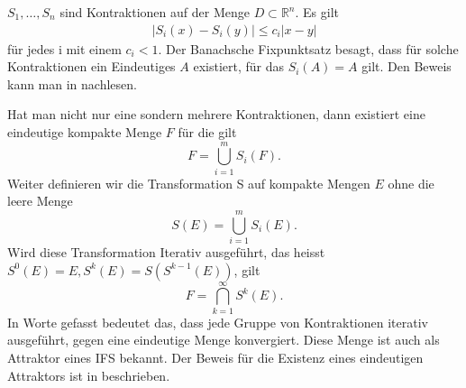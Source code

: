 $S_1,\dots,S_n$ sind Kontraktionen auf der Menge $D \subset \mathbb{R}^n$. Es gilt
\begin{align}
	|S_i(x) - S_i(y)| \leq c_i|x - y|
\end{align}
für jedes i mit einem $c_i < 1$.
Der Banachsche Fixpunktsatz besagt, dass für solche Kontraktionen ein Eindeutiges $A$ existiert, für das $S_i(A) = A$ gilt.
Den Beweis kann man in \cite{ifs:Rousseau2012} nachlesen.

Hat man nicht nur eine sondern mehrere Kontraktionen, dann existiert eine eindeutige kompakte Menge $F$ für die gilt
\begin{equation}
	F = \bigcup\limits_{i = 1}^{m} S_i(F).
\end{equation}
Weiter definieren wir die Transformation S auf kompakte Mengen $E$ ohne die leere Menge
\begin{equation}
	S(E) = \bigcup\limits_{i = 1}^m S_i(E).
	\label{ifs:transformation}
\end{equation}
Wird diese Transformation Iterativ ausgeführt, das heisst $S^0(E) = E, S^k(E) = S(S^{k-1}(E))$, gilt
\begin{equation}
	F = \bigcap\limits_{k = 1}^{\infty} S^k(E).
	\label{ifs:ifsForm}
\end{equation}
In Worte gefasst bedeutet das, dass jede Gruppe von Kontraktionen iterativ ausgeführt, gegen eine eindeutige Menge konvergiert.
Diese Menge ist auch als Attraktor eines IFS bekannt.
Der Beweis für die Existenz eines eindeutigen Attraktors ist in \cite{ifs:fractal-geometry} beschrieben. 

